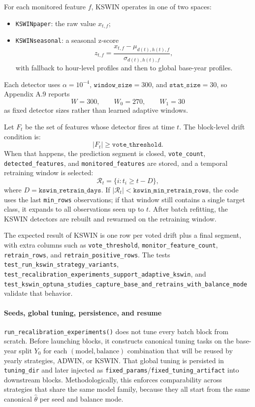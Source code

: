 For each monitored feature \(f\), KSWIN operates in one of two spaces:
\begin{itemize}[leftmargin=*]
  \item \texttt{KSWINpaper}: the raw value \(x_{t,f}\);
  \item \texttt{KSWINseasonal}: a seasonal z-score
  \[
  z_{t,f} = \frac{x_{t,f} - \mu_{d(t),h(t),f}}{\sigma_{d(t),h(t),f}},
  \]
  with fallback to hour-level profiles and then to global base-year profiles.
\end{itemize}
Each detector uses \(\alpha = 10^{-4}\), \(\texttt{window\_size}=300\), and \(\texttt{stat\_size}=30\), so Appendix A.9 reports
\[
W = 300,\qquad W_0 = 270,\qquad W_1 = 30
\]
as fixed detector sizes rather than learned adaptive windows.

Let \(F_t\) be the set of features whose detector fires at time \(t\). The block-level drift condition is:
\[
|F_t| \ge \texttt{vote\_threshold}.
\]
When that happens, the prediction segment is closed, \texttt{vote\_count}, \texttt{detected\_features}, and \texttt{monitored\_features} are stored, and a temporal retraining window is selected:
\[
\mathcal{R}_t = \{i : t_i \ge t - D\},
\]
where \(D = \texttt{kswin\_retrain\_days}\). If \(|\mathcal{R}_t| < \texttt{kswin\_min\_retrain\_rows}\), the code uses the last \texttt{min\_rows} observations; if that window still contains a single target class, it expands to all observations seen up to \(t\). After batch refitting, the KSWIN detectors are rebuilt and rewarmed on the retraining window.

The expected result of KSWIN is one row per voted drift plus a final segment, with extra columns such as \texttt{vote\_threshold}, \texttt{monitor\_feature\_count}, \texttt{retrain\_rows}, and \texttt{retrain\_positive\_rows}. The tests \texttt{test\_run\_kswin\_strategy\_variants}, \texttt{test\_recalibration\_experiments\_support\_adaptive\_kswin}, and \texttt{test\_kswin\_optuna\_studies\_capture\_base\_and\_retrains\_with\_balance\_mode} validate that behavior.

\paragraph{Seeds, global tuning, persistence, and resume}
\texttt{run\_recalibration\_experiments()} does not tune every batch block from scratch. Before launching blocks, it constructs canonical tuning tasks on the base-year split \(Y_0\) for each \((\text{model}, \text{balance})\) combination that will be reused by yearly strategies, ADWIN, or KSWIN. That global tuning is persisted in \texttt{tuning\_dir} and later injected as \texttt{fixed\_params}/\texttt{fixed\_tuning\_artifact} into downstream blocks. Methodologically, this enforces comparability across strategies that share the same model family, because they all start from the same canonical \(\hat{\theta}\) per seed and balance mode.

